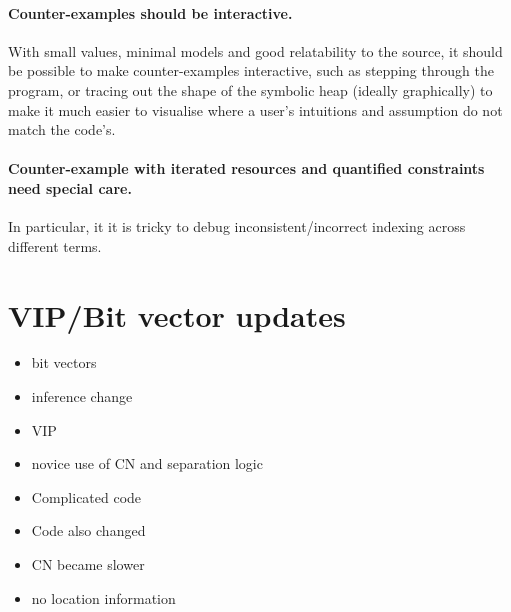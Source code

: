 \paragraph{Counter-examples should be interactive.} With small values, minimal
models and good relatability to the source, it should be possible to make
counter-examples interactive, such as stepping through the program, or tracing
out the shape of the symbolic heap (ideally graphically) to make it much easier
to visualise where a user's intuitions and assumption do not match the code's.

\paragraph{Counter-example with iterated resources and quantified constraints
need special care.} In particular, it it is tricky to debug
inconsistent/incorrect indexing across different terms.

\section{VIP/Bit vector updates}

\begin{itemize}
    \item bit vectors
    \item inference change
    \item VIP
    \item novice use of CN and separation logic
    \item Complicated code
    \item Code also changed
    \item CN became slower
    \item no location information
\end{itemize}

